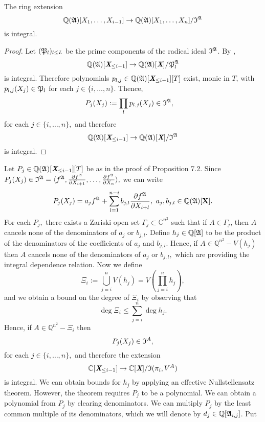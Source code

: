 \documentclass[sigconf]{acmart}
\def\Xb{\textit{\textbf{X}}}
\def\C{\mathbb{C}}
\def\Q{\mathbb{Q}}
\def\I{\frak{I}}
\def\A{\frak{A}}
\def\fp{\frak{P}}
\begin{document}
\begin{lemma} 
The ring
extension \[\mathbb{Q}(\frak{A})[X_1,\dots,X_{i-1}]\rightarrow\mathbb{Q}(\frak{A})[X_1,\dots,X_n]/\I^{\A}\]
is integral.
\end{lemma}
%
\begin{proof}
Let $(\frak{P}_l)_{l \leq L}$ be the prime components of the radical ideal $\I^\A$. By \cite[Proposition 1]{EMP}, 
\[
\mathbb{Q}(\frak{A})[\Xb_{\leq i-1}]\rightarrow\mathbb{Q}(\frak{A})[\Xb]/\fp_l^{\A}
\] 
is integral. Therefore polynomials $p_{l,j}\in\mathbb{Q}(\frak{A})[\Xb_{\leq i-1}][T]$ exist, monic in $T$, with $p_{l,j}(X_j)\in \frak{P}_l$ for each $j\in \{i,\hdots,n\}.$ Thence, 
%
\begin{align*}
&P_{j}(X_j) := \prod_l p_{l,j}(X_j)\in\I^\A, 
\end{align*}
%
for each $j \in \{i,\hdots,n\},$ and therefore 
\[
\mathbb{Q}(\frak{A})[\Xb_{\leq i-1}]\rightarrow\mathbb{Q}(\frak{A})[\Xb]/\I^{\A}
\] 
is integral.
\end{proof}
%
Let $P_{j} \in \mathbb{Q}(\frak{A})[\Xb_{\leq i-1}][T]$ be as in the proof of Proposition 7.2. Since $P_{j}(X_j) \in\I^{\A}= \langle f^\A,\frac{\partial f^\A}{\partial X_{i+1}},\hdots,\frac{\partial f^\A}{\partial X_n} \rangle,$
 we can write
\[
P_{j}(X_j) = a_j f^{\A} + \sum_{l=1}^{n-i}b_{j,l} \frac{\partial f^\A}{\partial X_{i+l}}, ~a_j,b_{j,l} \in \mathbb{Q}(\A)[\textbf{X}].
\]
For each $P_j,$ there exists a Zariski open set $\Gamma_j \subset \C^{n^2}$ such that if $A \in \Gamma_j$,
then $A$ cancels none of the denominators of $a_{j}$ or $b_{j,l}$. Define $h_j \in \Q[\A]$ to be the product of the denominators of the coefficients of $a_j$ and $b_{j,l}$. Hence, if $A \in \Q^{n^2}-V(h_j)$ then $A$ cancels none of the denominators of $a_{j}$ or $b_{j,l},$ which are providing the integral dependence relation. Now we define 
\[
\Xi_i := \bigcup_{j=i}^n V(h_j) =V\left(\prod_{j=i}^n h_j \right), 
\]
and we obtain a bound on the degree of $\Xi_i$ by observing that
\[
\deg \Xi_i \leq \sum_{j=i}^n \deg h_j.
\]
Hence, if $A\in \Q^{n^2}-\Xi_i$ then
\[
P_j(X_j) \in \I^A,  
\]
for each $j \in \{i,\hdots,n\},$ and therefore the extension 
\[
\mathbb{C}[{\Xb}_{\leq i-1}]\rightarrow\mathbb{C}[\Xb]/\I(\pi_i,V^{A})
\]
is integral. We can obtain bounds for $h_j$ by applying an effective Nullstellensatz theorem. However, the theorem requires $P_{j}$ to be a polynomial. We can obtain a polynomial from $P_{j}$ by clearing denominators. We can multiply $P_{j}$ by the least common multiple of its denominators, which we will denote by $d_j \in \Q[\A_{i,j}]$. Put 
\end{document}

